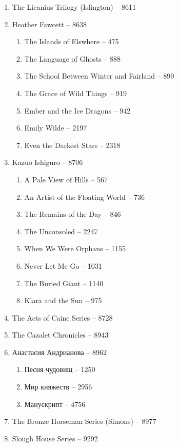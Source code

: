 \documentclass[a4paper, 11pt]{proc} %
\begin{document}
\begin{enumerate}
\begin{enumerate}
        \end{enumerate}
    \item The Licanius Trilogy (Islington) -- 8611
    \item Heather Fawcett -- 8638
        \begin{enumerate}
            \item The Islands of Elswhere -- 475
            \item The Language of Ghosts -- 888
            \item The School Between Winter and Fairland -- 899
            \item The Grace of Wild Things -- 919
            \item Ember and the Ice Dragons -- 942
            \item Emily Wilde -- 2197
            \item Even the Darkest Stars -- 2318
        \end{enumerate}
    \item Kazuo Ishiguro -- 8706
        \begin{enumerate}
            \item A Pale View of Hills -- 567
            \item An Artist of the Floating World -- 736
            \item The Remains of the Day -- 846
            \item The Unconsoled -- 2247
            \item When We Were Orphans -- 1155
            \item Never Let Me Go -- 1031
            \item The Buried Giant -- 1140
            \item Klara and the Sun -- 975
        \end{enumerate}
    \item The Acts of Caine Series -- 8728
    \item The Cazalet Chronicles -- 8943
    \item Анастасия Андрианова -- 8962
        \begin{enumerate}
            \item Песня чудовищ -- 1250
            \item Мир княжеств -- 2956
            \item Манускрипт -- 4756
        \end{enumerate}
    \item The Bronze Horseman Series (Simons) -- 8977
    \item Slough House Series -- 9292

\end{enumerate}
\end{document}
